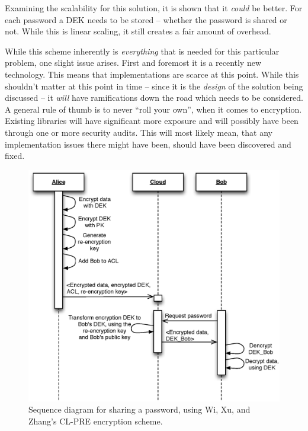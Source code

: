 				Examining the scalability for this solution, it is shown that it \emph{could} be better. For each password a DEK needs to be stored -- whether the password is shared or not. While this is linear scaling, it still creates a fair amount of overhead.

				While this scheme inherently is \emph{everything} that is needed for this particular problem, one slight issue arises. First and foremost it is a recently new technology. This means that implementations are scarce at this point. While this shouldn't matter at this point in time -- since it is the \emph{design} of the solution being discussed -- it \emph{will} have ramifications down the road which needs to be considered. A general rule of thumb is to never ``roll your own'', when it comes to encryption. Existing libraries will have significant more exposure and will possibly have been through one or more security audits. This will most likely mean, that any implementation issues there might have been, should have been discovered and fixed.

				\begin{figure}[h!]
					\centering
					\includegraphics[width=\textwidth]{figures/design/uml/sequence/cl-pre.eps}
					\caption{Sequence diagram for sharing a password, using Wi, Xu, and Zhang's CL-PRE encryption scheme\cite{Wu:2011:PCP:2046707.2093514}.}
					\label{fig:sequence:cl-pre}
				\end{figure}

